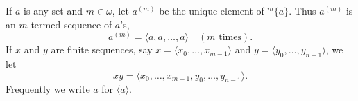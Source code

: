 If $a$ is any set and $m \in \omega$, let $a^{(m)}$ be the unique element of $^{m}\{a\}$. Thus $a^{(m)}$ is an $m$-termed sequence of $a$'s,
$$a^{(m)} = \langle a, a, \ldots, a \rangle \quad (m \text{ times}).$$
If $x$ and $y$ are finite sequences, say $x = \langle x_0, \ldots, x_{m-1} \rangle$ and $y = \langle y_0, \ldots, y_{n-1} \rangle$, we let
$$xy = \langle x_0, \ldots, x_{m-1}, y_0, \ldots, y_{n-1} \rangle.$$
Frequently we write $a$ for $\langle a \rangle$.
